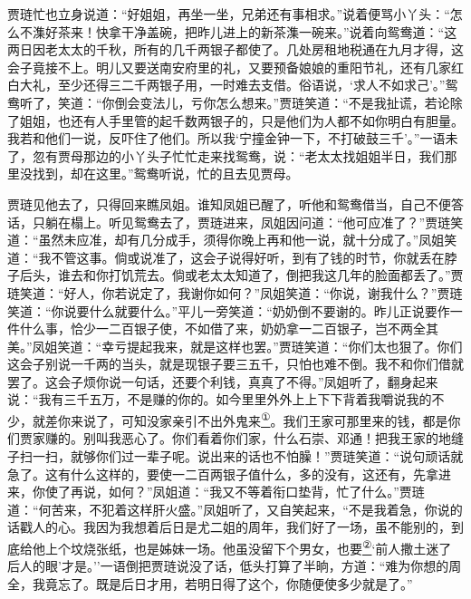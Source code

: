 贾琏忙也立身说道：``好姐姐，再坐一坐，兄弟还有事相求。''说着便骂小丫头：``怎么不潗好茶来！快拿干净盖碗，把昨儿进上的新茶潗一碗来。''说着向鸳鸯道：``这两日因老太太的千秋，所有的几千两银子都使了。几处房租地税通在九月才得，这会子竟接不上。明儿又要送南安府里的礼，又要预备娘娘的重阳节礼，还有几家红白大礼，至少还得三二千两银子用，一时难去支借。俗语说，`求人不如求己'。''鸳鸯听了，笑道：``你倒会变法儿，亏你怎么想来。''贾琏笑道：``不是我扯谎，若论除了姐姐，也还有人手里管的起千数两银子的，只是他们为人都不如你明白有胆量。我若和他们一说，反吓住了他们。所以我`宁撞金钟一下，不打破鼓三千'。''一语未了，忽有贾母那边的小丫头子忙忙走来找鸳鸯，说：``老太太找姐姐半日，我们那里没找到，却在这里。''鸳鸯听说，忙的且去见贾母。

贾琏见他去了，只得回来瞧凤姐。谁知凤姐已醒了，听他和鸳鸯借当，自己不便答话，只躺在榻上。听见鸳鸯去了，贾琏进来，凤姐因问道：``他可应准了？''贾琏笑道：``虽然未应准，却有几分成手，须得你晚上再和他一说，就十分成了。''凤姐笑道：``我不管这事。倘或说准了，这会子说得好听，到有了钱的时节，你就丢在脖子后头，谁去和你打饥荒去。倘或老太太知道了，倒把我这几年的脸面都丢了。''贾琏笑道：``好人，你若说定了，我谢你如何？''凤姐笑道：``你说，谢我什么？''贾琏笑道：``你说要什么就要什么。''平儿一旁笑道：``奶奶倒不要谢的。昨儿正说要作一件什么事，恰少一二百银子使，不如借了来，奶奶拿一二百银子，岂不两全其美。''凤姐笑道：``幸亏提起我来，就是这样也罢。''贾琏笑道：``你们太也狠了。你们这会子别说一千两的当头，就是现银子要三五千，只怕也难不倒。我不和你们借就罢了。这会子烦你说一句话，还要个利钱，真真了不得。''凤姐听了，翻身起来说：``我有三千五万，不是赚的你的。如今里里外外上上下下背着我嚼说我的不少，就差你来说了，可知没家亲引不出外鬼来\href{../Text/part0076_split_000.html\#lnkback_1_a}{\textsuperscript{①}}。我们王家可那里来的钱，都是你们贾家赚的。别叫我恶心了。你们看着你们家，什么石崇、邓通！把我王家的地缝子扫一扫，就够你们过一辈子呢。说出来的话也不怕臊！''贾琏笑道：``说句顽话就急了。这有什么这样的，要使一二百两银子值什么，多的没有，这还有，先拿进来，你使了再说，如何？''凤姐道：``我又不等着衔口垫背，忙了什么。''贾琏道：``何苦来，不犯着这样肝火盛。''凤姐听了，又自笑起来，``不是我着急，你说的话戳人的心。我因为我想着后日是尤二姐的周年，我们好了一场，虽不能别的，到底给他上个坟烧张纸，也是姊妹一场。他虽没留下个男女，也要\href{../Text/part0076_split_000.html\#lnkback_2_a}{\textsuperscript{②}}`前人撒土迷了后人的眼'才是。''一语倒把贾琏说没了话，低头打算了半晌，方道：``难为你想的周全，我竟忘了。既是后日才用，若明日得了这个，你随便使多少就是了。''

